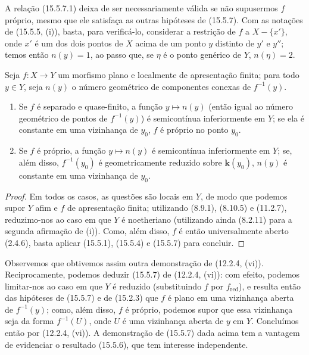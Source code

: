 \begin{remark}[15.5.8]
\label{IV.15.5.8}
A relação (15.5.7.1) deixa de ser necessariamente válida se não supusermos $f$ próprio, mesmo que ele satisfaça as outras hipóteses de (15.5.7). Com as notações de (15.5.5, (i)), basta, para verificá-lo, considerar a restrição de $f$ a $X-\{x'\}$, onde $x'$ é um dos dois pontos de $X$ acima de um ponto $y$ distinto de $y'$ e $y''$; temos então $n(y)=1$, ao passo que, se $\eta$ é o ponto genérico de $Y$, $n(\eta)=2$.
\end{remark}

\begin{proposition}[15.5.9]
\label{IV.15.5.9}
Seja $f:X\to Y$ um morfismo plano e localmente de apresentação finita; para todo $y\in Y$, seja $n(y)$ o número geométrico de componentes conexas de $f^{-1}(y)$.
\begin{enumerate}[label=\emph{(\roman*)}]
  \item Se $f$ é separado e quase-finito, a função $y\mapsto n(y)$ (então igual ao número geométrico de pontos de $f^{-1}(y)$) é semicontínua inferiormente em $Y$; se ela é constante em uma vizinhança de $y_0$, $f$ é próprio no ponto $y_0$.
  \item Se $f$ é próprio, a função $y\mapsto n(y)$ é semicontínua inferiormente em $Y$; se, além disso, $f^{-1}(y_0)$ é geometricamente reduzido sobre $\mathbf{k}(y_0)$, $n(y)$ é constante em uma vizinhança de $y_0$.
\end{enumerate}
\end{proposition}

\begin{proof}
Em todos os casos, as questões são locais em $Y$, de modo que podemos supor $Y$ afim e $f$ de apresentação finita; utilizando (8.9.1), (8.10.5) e (11.2.7), reduzimo-nos ao caso em que $Y$ é noetheriano (utilizando ainda (8.2.11) para a segunda afirmação de (i)). Como, além disso, $f$ é então universalmente aberto (2.4.6), basta aplicar (15.5.1), (15.5.4) e (15.5.7) para concluir.
\end{proof}

\begin{remark}[15.5.10]
\label{IV.15.5.10}
Observemos que obtivemos assim outra demonstração de (12.2.4, (vi)). Reciprocamente, podemos deduzir (15.5.7) de (12.2.4, (vi)): com efeito, podemos limitar-nos ao caso em que $Y$ é reduzido (substituindo $f$ por $f_{\mathrm{red}}$), e resulta então das hipóteses de (15.5.7) e de (15.2.3) que $f$ é plano em uma vizinhança aberta de $f^{-1}(y)$; como, além disso, $f$ é próprio, podemos supor que essa vizinhança seja da forma $f^{-1}(U)$, onde $U$ é uma vizinhança aberta de $y$ em $Y$. Concluímos então por (12.2.4, (vi)). A demonstração de (15.5.7) dada acima tem a vantagem de evidenciar o resultado (15.5.6), que tem interesse independente.
\end{remark}
